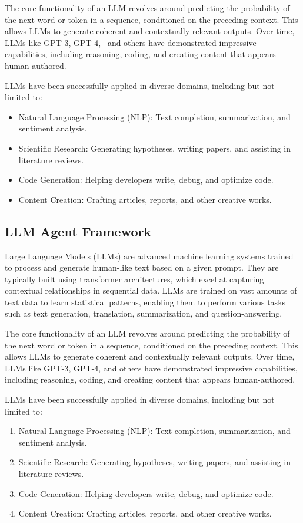 The core functionality of an LLM revolves around predicting the probability of the next word or token in a sequence, conditioned on the preceding context. This allows LLMs to generate coherent and contextually relevant outputs. Over time, LLMs like GPT-3, GPT-4,~\cite{openai2023} and others have demonstrated impressive capabilities, including reasoning, coding, and creating content that appears human-authored.

LLMs have been successfully applied in diverse domains, including but not limited to:

\begin{itemize}
    \item Natural Language Processing (NLP): Text completion, summarization, and sentiment analysis.
    \item Scientific Research: Generating hypotheses, writing papers, and assisting in literature reviews.
    \item Code Generation: Helping developers write, debug, and optimize code.
    \item Content Creation: Crafting articles, reports, and other creative works.
\end{itemize}

\subsection{LLM Agent Framework}
Large Language Models (LLMs) are advanced machine learning systems trained to process and generate human-like text based on a given prompt. They are typically built using transformer architectures, which excel at capturing contextual relationships in sequential data. LLMs are trained on vast amounts of text data to learn statistical patterns, enabling them to perform various tasks such as text generation, translation, summarization, and question-answering.

The core functionality of an LLM revolves around predicting the probability of the next word or token in a sequence, conditioned on the preceding context. This allows LLMs to generate coherent and contextually relevant outputs. Over time, LLMs like GPT-3, GPT-4, and others have demonstrated impressive capabilities, including reasoning, coding, and creating content that appears human-authored.

LLMs have been successfully applied in diverse domains, including but not limited to:

\begin{enumerate}
    \item Natural Language Processing (NLP): Text completion, summarization, and sentiment analysis.
    \item Scientific Research: Generating hypotheses, writing papers, and assisting in literature reviews.
    \item Code Generation: Helping developers write, debug, and optimize code.
    \item Content Creation: Crafting articles, reports, and other creative works.
\end{enumerate}

